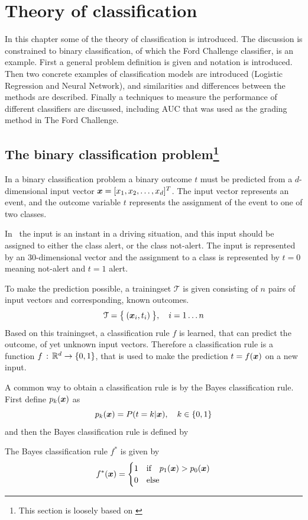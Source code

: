 \chapter{Theory of classification}
In this chapter some of the theory of classification is introduced. The discussion is constrained to binary classification, of which the Ford Challenge classifier, is an example. First a general problem definition is given and notation is introduced. Then two concrete examples of classification models are introduced (Logistic Regression and Neural Network), and similarities and differences between the methods are described. Finally a techniques to measure the performance of different classifiers are discussed, including AUC that was used as the grading method in The Ford Challenge.

\section[The binary classification problem]{The binary classification problem\protect\footnote{This section is loosely based on \citet[sec 22.1-22.2]{wasserman04}}}
In a binary classification problem a binary outcome $t$ must be predicted from a $d$-dimensional input vector $\boldsymbol{x}=[x_1, x_2, \dots, x_d]^T$. The input vector represents an event, and the outcome variable $t$ represents the assignment of the event to one of two classes.
\begin{Exa}
    In \TFC\ the input is an instant in a driving situation, and this input should be assigned to either the class alert, or the class not-alert. The input is represented by an 30-dimensional vector and the assignment to a class is represented by $t=0$ meaning not-alert and $t=1$ alert.
\end{Exa}
To make the prediction possible, a trainingset $\mathcal{T}$ is given consisting of $n$ pairs of input vectors and corresponding, known outcomes.
\[
    \mathcal{T} = \bigl\{\:(\boldsymbol{x}_i, t_i)\:\bigr\},\quad i=1\dots n
\]
Based on this trainingset, a classification rule $f$ is learned, that can predict the outcome, of yet unknown input vectors. Therefore a classification rule is a function $f\,:\,\mathbb{R}^d\to\{0,1\}$, that is used to make the prediction $t=f(\boldsymbol{x})$ on a new input. \par
A common way to obtain a classification rule is by the Bayes classification rule. First define $p_k(\boldsymbol{x})$ as
    \[
        p_k(\boldsymbol{x}) = P(t=k|\boldsymbol{x}),\quad k\in\{0,1\}
    \]
    and then the Bayes classification rule is defined by
    \begin{definition}\label{def:bayes-rule}
        The Bayes classification rule $f^*$ is given by
        \[
            f^*(\boldsymbol{x}) = \begin{cases}
                1 & \text{if}\quad p_1(\boldsymbol{x})>p_0(\boldsymbol{x}) \\
                0 & \text{else}
            \end{cases}
        \]
    \end{definition}
